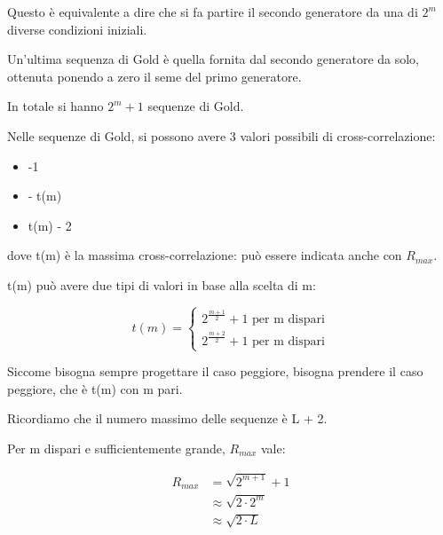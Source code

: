 Questo è equivalente a dire che si fa partire il secondo generatore da una di $2^{m}$ 
diverse condizioni iniziali. \newline 

Un'ultima sequenza di Gold è quella fornita dal secondo generatore da solo, 
ottenuta ponendo a zero il seme del primo generatore. \newline  

In totale si hanno $2^{m} + 1$ sequenze di Gold. \newline 

Nelle sequenze di Gold, 
si possono avere 3 valori possibili di cross-correlazione: 

\begin{itemize}
    \item -1 
    \item - t(m) 
    \item t(m) - 2
\end{itemize}

dove t(m) è la massima cross-correlazione: può essere indicata anche con $R_{max}$. \newline 

t(m) può avere due tipi di valori in base alla scelta di m: 

{
    \Large 
    \begin{equation}
        t(m)
        =
        \begin{cases}
            2^{\frac{m+1}{2}} + 1 \text{ per m dispari} 
            \\ 
            2^{\frac{m+2}{2}} + 1 \text{ per m dispari}
        \end{cases}
    \end{equation}
}

Siccome bisogna sempre progettare il caso peggiore, 
bisogna prendere il caso peggiore, che è t(m) con m pari. \newline 

Ricordiamo che il numero massimo delle sequenze è L + 2. \newline 

Per m dispari e sufficientemente grande, $R_{max}$ vale: 

{
    \Large 
    \begin{equation}
        \begin{split}
            R_{max} 
            &= 
            \sqrt{2^{m+1}} + 1 
            \\
            &\approx 
            \sqrt{2 \cdot 2^{m}}
            \\
            &\approx
            \sqrt{2 \cdot L}
        \end{split}
    \end{equation}
}

